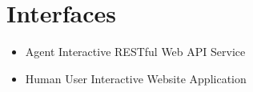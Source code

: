 \documentclass[12pt]{article}
\begin{document}
\section{Interfaces}
\begin{itemize}
	\item{Agent Interactive RESTful Web API Service}
	\item{Human User Interactive Website Application}
\end{itemize}
\end{document}
